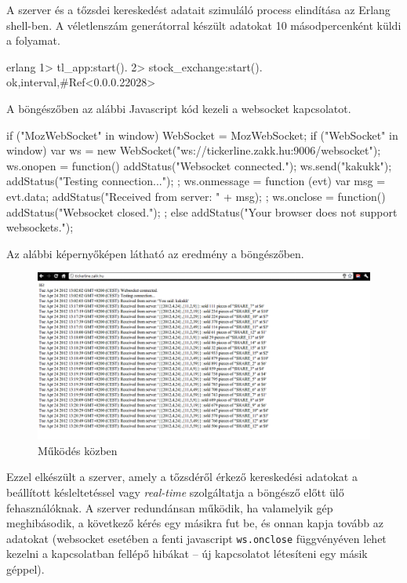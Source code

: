 \documentclass[12pt, a4paper, oneside]{book}
\begin{document}
A szerver és a tőzsdei kereskedést adatait szimuláló process elindítása az
Erlang shell-ben. A véletlenszám generátorral készült adatokat 10
másodpercenként küldi a folyamat.

\begin{code}{erlang}{}
1> tl_app:start().
2> stock_exchange:start().
{ok,{interval,#Ref<0.0.0.22028>}}
\end{code}

A böngészőben az alábbi Javascript kód kezeli a websocket kapcsolatot.

\begin{code}{}{}
  if ("MozWebSocket" in window) {
    WebSocket = MozWebSocket;
  }
  if ("WebSocket" in window) {
    var ws = 
      new WebSocket("ws://tickerline.zakk.hu:9006/websocket");
    ws.onopen = function() {
      addStatus("Websocket connected.");
      ws.send("kakukk");
      addStatus("Testing connection...");
    };
    ws.onmessage = function (evt) {
      var msg = evt.data;
      addStatus("Received from server: " + msg);
    };
    ws.onclose = function() {
      addStatus("Websocket closed.");
    };
  } else {
    addStatus("Your browser does not support websockets.");
  }
\end{code}

Az alábbi képernyőképen látható az eredmény a böngészőben.

\begin{figure}
\caption{Működés közben}
\includegraphics[scale=0.33]{fig/Browser.png}
\end{figure}

Ezzel elkészült a szerver, amely a tőzsdéről érkező kereskedési adatokat a
beállított késleltetéssel vagy \emph{real-time} szolgáltatja a böngésző előtt
ülő fehasználóknak. A szerver redundánsan működik, ha valamelyik gép
meghibásodik, a következő kérés egy másikra fut be, és onnan kapja tovább az
adatokat (websocket esetében a fenti javascript \texttt{ws.onclose}
függvényéven lehet kezelni a kapcsolatban fellépő hibákat -- új kapcsolatot
létesíteni egy másik géppel).
\end{document}
